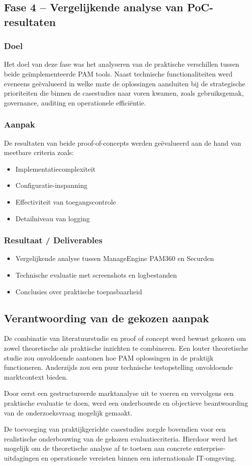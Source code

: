 \subsection{Fase 4 – Vergelijkende analyse van PoC-resultaten}

\subsubsection{Doel}

Het doel van deze fase was het analyseren van de praktische verschillen tussen beide geïmplementeerde PAM tools. Naast technische functionaliteiten werd eveneens geëvalueerd in welke mate de oplossingen aansluiten bij de strategische prioriteiten die binnen de casestudies naar voren kwamen, zoals gebruiksgemak, governance, auditing en operationele efficiëntie.
\subsubsection{Aanpak}
De resultaten van beide proof-of-concepts werden geëvalueerd aan de hand van meetbare criteria zoals:
\begin{itemize}
	\item Implementatiecomplexiteit
	\item Configuratie-inspanning
	\item Effectiviteit van toegangscontrole
	\item Detailniveau van logging
\end{itemize}
\subsubsection{Resultaat / Deliverables}
\begin{itemize}
	\item Vergelijkende analyse tussen ManageEngine PAM360 en Securden
	\item Technische evaluatie met screenshots en logbestanden
	\item Conclusies over praktische toepasbaarheid
\end{itemize}

\subsection{Verantwoording van de gekozen aanpak}

De combinatie van literatuurstudie en proof of concept werd bewust gekozen om zowel theoretische als praktische inzichten te combineren. Een louter theoretische studie zou onvoldoende aantonen hoe PAM oplossingen in de praktijk functioneren. Anderzijds zou een puur technische testopstelling onvoldoende marktcontext bieden.

Door eerst een gestructureerde marktanalyse uit te voeren en vervolgens een praktische evaluatie te doen, werd een onderbouwde en objectieve beantwoording van de onderzoeksvraag mogelijk gemaakt.

De toevoeging van praktijkgerichte casestudies zorgde bovendien voor een realistische onderbouwing van de gekozen evaluatiecriteria. Hierdoor werd het mogelijk om de theoretische analyse af te toetsen aan concrete enterprise-uitdagingen en operationele vereisten binnen een internationale IT-omgeving.
